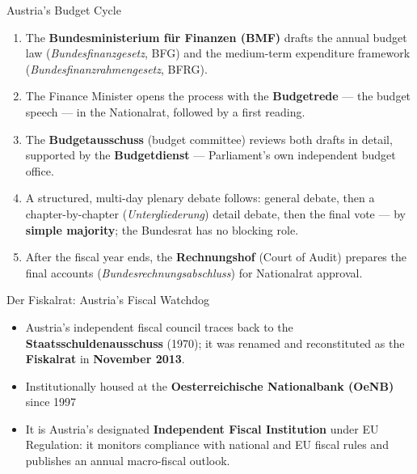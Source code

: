 \documentclass[11pt,aspectratio=169]{beamer}
\begin{document}
\begin{frame}{Austria's Budget Cycle}
 
  \begin{enumerate}
    \setlength{\itemsep}{3pt}
    \item The \textbf{Bundesministerium für Finanzen (BMF)} drafts the annual budget law (\emph{Bundesfinanzgesetz}, BFG) and the medium-term expenditure framework (\emph{Bundesfinanzrahmengesetz}, BFRG).
    \item The Finance Minister opens the process with the \textbf{Budgetrede} --- the budget speech --- in the Nationalrat, followed by a first reading.
    \item The \textbf{Budgetausschuss} (budget committee) reviews both drafts in detail, supported by the \textbf{Budgetdienst} --- Parliament's own independent budget office.
    \item A structured, multi-day plenary debate follows: general debate, then a chapter-by-chapter (\emph{Untergliederung}) detail debate, then the final vote --- by \textbf{simple majority}; the Bundesrat has no blocking role.
    \item After the fiscal year ends, the \textbf{Rechnungshof} (Court of Audit) prepares the final accounts (\emph{Bundesrechnungsabschluss}) for Nationalrat approval.
  \end{enumerate}
  
\end{frame}

 

\begin{frame}{Der Fiskalrat: Austria's Fiscal Watchdog}
  
  \begin{itemize}
    \item Austria's independent fiscal council traces back to the \textbf{Staatsschuldenausschuss} (1970); it was renamed and reconstituted as the \textbf{Fiskalrat} in \textbf{November 2013}.
    \item Institutionally housed at the \textbf{Oesterreichische Nationalbank (OeNB)} since 1997 
    \item It is Austria's designated \textbf{Independent Fiscal Institution} under EU Regulation: it monitors compliance with national and EU fiscal rules and publishes an annual macro-fiscal outlook.
  \end{itemize}
 
\end{frame}
\end{document}
